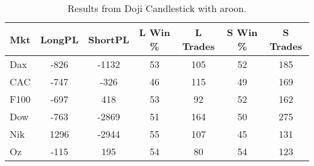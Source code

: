 \begin{table}[ht]
\centering
\caption[Doji Candlestick System with aroon]{Results from Doji Candlestick with aroon.} 
\label{tab:doji_aroon_results}
\begin{tabular}{lcccccc}
  \toprule Mkt & LongPL & ShortPL & L Win \% & L Trades & S Win \% & S Trades \\ 
  \midrule Dax & -826 & -1132 & 53 & 105 & 52 & 185 \\ 
  CAC & -747 & -326 & 46 & 115 & 49 & 169 \\ 
  F100 & -697 & 418 & 53 & 92 & 52 & 162 \\ 
  Dow & -763 & -2869 & 51 & 164 & 50 & 275 \\ 
  Nik & 1296 & -2944 & 55 & 107 & 45 & 131 \\ 
  Oz & -115 & 195 & 54 & 80 & 54 & 123 \\ 
   \bottomrule \end{tabular}
\end{table}
